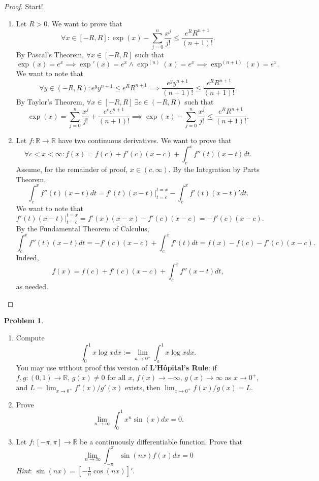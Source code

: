 \documentclass[12pt]{article}
\theoremstyle{definition}
\newtheorem{problem}{Problem}
\begin{document}
\begin{proof}
    Start!
    \begin{enumerate}[label=(\alph*)]
        \item Let \(R > 0\). We want to prove that 
        \[
            \forall x \in [-R, R] : \exp(x) - \sum_{j = 0}^{n}\frac{x^j}{j!} \leq \frac{e^{R}R^{n + 1}}{(n + 1)!}.
        \]
        By Pascal's Theorem, \(\forall x \in [-R, R]\) such that
        \[
            \exp(x) = e^x \implies \exp'(x) = e^x \land \exp^{(n)}(x) = e^x \implies \exp^{(n + 1)}(x) = e^x. 
        \]
        We want to note that
        \[
            \forall y \in (-R, R) : e^{y}y^{n + 1} \leq e^{R}R^{n + 1} \implies \frac{e^{y}y^{n + 1}}{(n + 1)!} \leq \frac{e^{R}R^{n + 1}}{(n + 1)!}.
        \]
        By Taylor's Theorem, \(\forall x \in [-R, R] \ \exists c \in (-R, R)\) such that
        \[
            \exp(x) = \sum_{j = 0}^{n}\frac{x^j}{j!} + \frac{e^{c}c^{n + 1}}{(n + 1)!} \implies \exp(x) - \sum_{j = 0}^{n}\frac{x^j}{j!} \leq \frac{e^{R}R^{n + 1}}{(n + 1)!}.
        \]
        \item Let \(f : \mathbb{R} \to \mathbb{R}\) have two continuous derivatives. We want to prove that
        \[
            \forall c < x < \infty: f(x) = f(c) + f'(c)(x - c) + \int_{c}^{x}f''(t)(x - t)dt.
        \]
        Assume, for the remainder of proof, \(x \in (c, \infty)\). By the Integration by Parts Theorem,
        \[
            \int_{c}^{x} f''(t)(x - t)dt = f'(t)(x - t) \bigg\vert_{t = c}^{t = x} - \int_{c}^{x}f'(t)(x - t)'dt.
        \]
        We want to note that
        \[
            f'(t)(x - t) \bigg\vert_{t = c}^{t = x} = f'(x)(x - x) - f'(c)(x - c) = -f'(c)(x - c).
        \]
        By the Fundamental Theorem of Calculus,
        \[
            \int_{c}^{x}f''(t)(x - t)dt = -f'(c)(x - c) + \int_{c}^{x}f'(t)dt = f(x) - f(c) - f'(c)(x - c). 
        \]
        Indeed,
        \[
            f(x) = f(c) + f'(c)(x - c) + \int_{c}^{x}f''(x - t)dt,
        \]
        as needed.
    \end{enumerate}
\end{proof}

\begin{problem}
    \hfill
    \begin{enumerate}[label=(\alph*)]
        \item Compute 
        \[
            \int_{0}^{1}x\log{x}dx := \lim_{a \to 0^{+}} \int_{a}^{1} x\log{x}dx.
        \]
        You may use without proof this version of \textbf{L’Hôpital’s Rule}: if \(f, g : (0, 1) \to \mathbb{R}\), \(g(x) \neq 0\) for all \(x\), \(f(x) \to -\infty\), \(g(x) \to \infty\) as \(x \to 0^{+}\), and \(L = \lim_{x \to 0^{+}}f'(x)/g'(x)\) exists, then \(\lim_{x \to 0^{+}} f(x)/g(x) = L\).
        \item Prove 
        \[
            \lim_{n \to \infty}\int_{0}^{1}x^n\sin(x)dx = 0.
        \]
        \item Let \(f : [-\pi, \pi] \to \mathbb{R}\) be a continuously differentiable function. Prove that
        \[
            \lim_{n \to \infty}\int_{-\pi}^{\pi}\sin(nx)f(x)dx = 0
        \]
        \textit{Hint}: \(\sin(nx) = [-\frac{1}{n}\cos(nx)]'\).
    \end{enumerate}
\end{problem}
\end{document}
